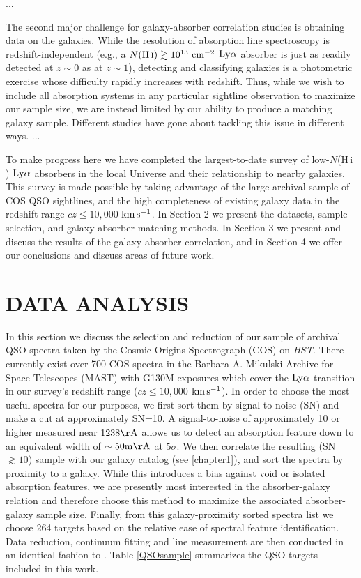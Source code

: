 \documentclass[twocolumn,tighten]{aastex62}
\newcommand{\kms}{$\rm km\, s^{-1}$}
\newcommand{\HI}{\mbox{H\,{\sc i}} }
\begin{document}
...


The second major challenge for galaxy-absorber correlation studies is obtaining data on the galaxies. While the resolution of absorption line spectroscopy is redshift-independent (e.g., a $N(\HI) \gtrsim 10^{13}  ~\rm cm^{-2}$ $\rm Ly\alpha$ absorber is just as readily detected at $z\sim0$ as at $z\sim 1$), detecting and classifying galaxies is a photometric exercise whose difficulty rapidly increases with redshift. Thus, while we wish to include all absorption systems in any particular sightline observation to maximize our sample size, we are instead limited by our ability to produce a matching galaxy sample. Different studies have gone about tackling this issue in different ways. ...


To make progress here we have completed the largest-to-date survey of low-$N$(\HI) $\rm Ly\alpha$ absorbers in the local Universe and their relationship to nearby galaxies. This survey is made possible by taking advantage of the large archival sample of COS QSO sightlines, and the high completeness of existing galaxy data in the redshift range $cz \leq 10,000$ \kms. In Section 2 we present the datasets, sample selection, and galaxy-absorber matching methods. In Section 3 we present and discuss the results of the galaxy-absorber correlation, and in Section 4 we offer our conclusions and discuss areas of future work.



\section{DATA ANALYSIS}
In this section we discuss the selection and reduction of our sample of archival QSO spectra taken by the Cosmic Origins Spectrograph (COS) on \textit{HST}. There currently exist over 700 COS spectra in the Barbara A. Mikulski Archive for Space Telescopes (MAST) with G130M exposures which cover the $\rm Ly\alpha$ transition in our survey's redshift range ($cz \leq 10,000$ \kms). In order to choose the most useful spectra for our purposes, we first sort them by signal-to-noise (SN) and make a cut at approximately SN=10. A signal-to-noise of approximately 10 or higher measured near $\rm 1238 \AA$ allows us to detect an absorption feature down to an equivalent width of $\rm \sim 50 m\AA$ at $5\sigma$. We then correlate the resulting (SN$\gtrsim 10$) sample with our galaxy catalog (see \ref{chapter1}), and sort the spectra by proximity to a galaxy. While this introduces a bias against void or isolated absorption features, we are presently most interested in the absorber-galaxy relation and therefore choose this method to maximize the associated absorber-galaxy sample size. Finally, from this galaxy-proximity sorted spectra list we choose 264 targets based on the relative ease of spectral feature identification. Data reduction, continuum fitting and line measurement are then conducted in an identical fashion to \cite{french2017}. Table \ref{QSOsample} summarizes the QSO targets included in this work.
\end{document}
